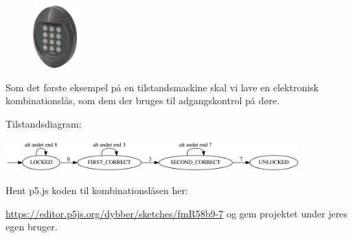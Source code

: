 \documentclass{ucph-handout}
\begin{document}
\begin{exercisebox}[adjusted title=Kombinationslås]
\begin{minipage}{1.0\linewidth}
\begin{figure}
    \vspace{-1em}
    \includegraphics[width=0.15\textwidth]{../illustrations/images/unitek_kombinationslaas.jpg}
\end{figure}
  
Som det første eksempel på en tilstandsmaskine skal vi lave en
elektronisk kombinationslås, som dem der bruges til adgangskontrol på
døre.

\noindent
Tilstandsdiagram:

\noindent
\includegraphics[width=0.85\textwidth]{../illustrations/graphviz/combinationLock_dumb}

Hent p5.js koden til kombinationslåsen her:

\mbox{\url{https://editor.p5js.org/dybber/sketches/fmR58b9-7}} og gem
projektet under jeres egen bruger.




\end{minipage}


\end{exercisebox}
\end{document}
